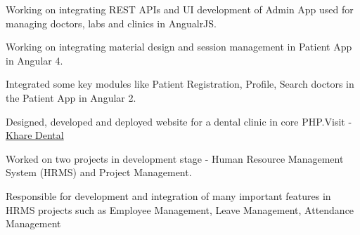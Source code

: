 \documentclass[]{deedy-resume-openfont}
\begin{document}
\begin{minipage}[t]{0.66\textwidth}
\sectionsep

\begin{tightemize}
 \item Working on integrating REST APIs and UI development of Admin App used for managing doctors, labs and clinics in AngualrJS. \item Working on integrating material design and session management in Patient App in Angular 4. \end{tightemize}


\sectionsep


\begin{tightemize}
 \item Integrated some key modules like Patient Registration, Profile, Search doctors in the Patient App in Angular 2. \item Designed, developed and deployed website for a dental clinic in core PHP.\newline Visit - \href{http://www.kharedentalclinic.com}{Khare Dental}  \end{tightemize}
 
\sectionsep


\begin{tightemize}
 \item Worked on two projects in development stage - Human Resource Management System (HRMS) and Project Management. \item Responsible for development and integration of many important features in HRMS projects such as
Employee Management, Leave Management, Attendance Management
\end{tightemize}

\sectionsep


\end{minipage}
\end{document}
